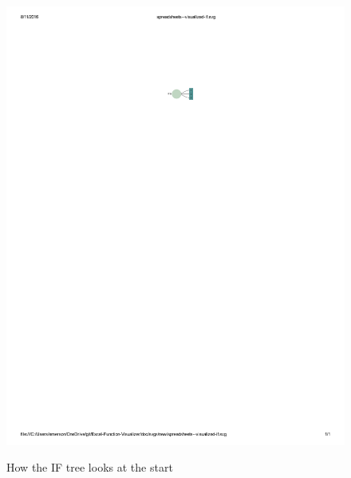 \documentclass[conference]{IEEEtran}
\begin{document}
	\begin{figure}[h] \centering \includegraphics{start} \label{fig:startpic}
		\caption{How the IF tree looks at the start} \end{figure}
	
\end{document}
